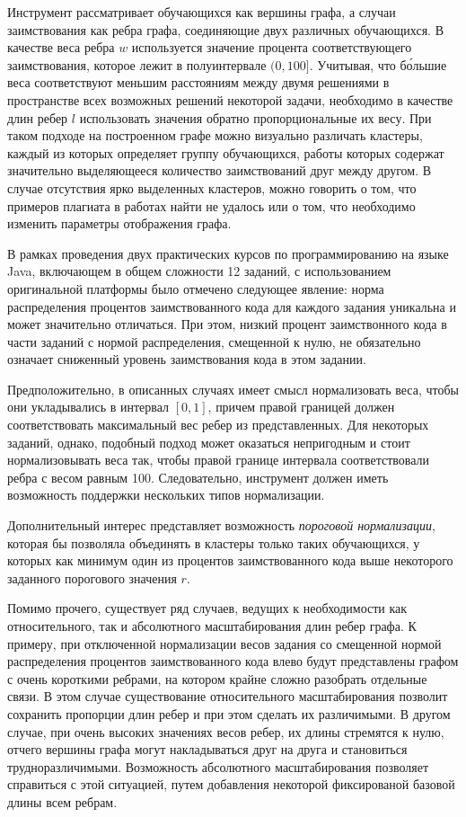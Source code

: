 \documentclass[a4paper,14pt]{extarticle}
\begin{document}
Инструмент рассматривает обучающихся как вершины графа, а случаи заимствования как ребра графа, соединяющие двух различных обучающихся. В качестве веса ребра $w$ используется значение процента соответствующего заимствования, которое лежит в полуинтервале $(0,100]$. Учитывая, что б\'{о}льшие веса соответствуют меньшим расстояниям между двумя решениями в пространстве всех возможных решений некоторой задачи, необходимо в качестве длин ребер $l$ использовать значения обратно пропорциональные их весу. При таком подходе на построенном графе можно визуально различать кластеры, каждый из которых определяет группу обучающихся, работы которых содержат значительно выделяющееся количество заимствований друг между другом. В случае отсутствия ярко выделенных кластеров, можно говорить о том, что примеров плагиата в работах найти не удалось или о том, что необходимо изменить параметры отображения графа.

В рамках проведения двух практических курсов по программированию на языке Java, включающем в общем сложности 12 заданий, с использованием оригинальной платформы было отмечено следующее явление: норма распределения процентов заимствованного кода для каждого задания уникальна и может значительно отличаться. При этом, низкий процент заимствонного кода в части заданий с нормой распределения, смещенной к нулю, не обязательно означает сниженный уровень заимствования кода в этом задании. 

Предположительно, в описанных случаях имеет смысл нормализовать веса, чтобы они укладывались в интервал $[0, 1]$, причем правой границей должен соответствовать максимальный вес ребер из представленных. Для некоторых заданий, однако, подобный подход может оказаться непригодным и стоит нормализовывать веса так, чтобы правой границе интервала соответствовали ребра с весом равным 100. Следовательно, инструмент должен иметь возможность поддержки нескольких типов нормализации.

Дополнительный интерес представляет возможность \textit{пороговой нормализации}, которая бы позволяла объединять в кластеры только таких обучающихся, у которых как минимум один из процентов заимствованного кода выше некоторого заданного порогового значения $r$.

Помимо прочего, существует ряд случаев, ведущих к необходимости как относительного, так и абсолютного масштабирования длин ребер графа. К примеру, при отключенной нормализации весов задания со смещенной нормой распределения процентов заимствованного кода влево будут представлены графом с очень короткими ребрами, на котором крайне сложно разобрать отдельные связи. В этом случае существование относительного масштабирования позволит сохранить пропорции длин ребер и при этом сделать их различимыми. В другом случае, при очень высоких значениях весов ребер, их длины стремятся к нулю, отчего вершины графа могут накладываться друг на друга и становиться трудноразличимыми. Возможность абсолютного масштабирования позволяет справиться с этой ситуацией, путем добавления некоторой фиксированой базовой длины всем ребрам.
\end{document}
